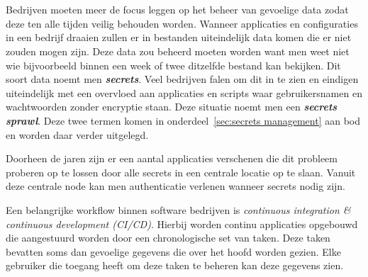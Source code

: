 
\chapter{}
\label{ch:inleiding}

Bedrijven moeten meer de focus leggen op het beheer van gevoelige data zodat deze ten alle tijden veilig behouden worden. Wanneer applicaties en configuraties in een bedrijf draaien zullen er in bestanden uiteindelijk data komen die er niet zouden mogen zijn. Deze data zou beheerd moeten worden want men weet niet wie bijvoorbeeld binnen een week of twee ditzelfde bestand kan bekijken. Dit soort data noemt men \textit{\textbf{secrets}}. Veel bedrijven falen om dit in te zien en eindigen uiteindelijk met een overvloed aan applicaties en scripts waar gebruikersnamen en wachtwoorden zonder encryptie staan. Deze situatie noemt men een \textit{\textbf{secrets sprawl}}. Deze twee termen komen in onderdeel~\ref{sec:secrets management} aan bod en worden daar verder uitgelegd.

Doorheen de jaren zijn er een aantal applicaties verschenen die dit probleem proberen op te lossen door alle secrets in een centrale locatie op te slaan. Vanuit deze centrale node kan men authenticatie verlenen wanneer secrets nodig zijn. 

Een belangrijke workflow binnen software bedrijven is \textit{continuous integration \& continuous development (CI/CD)}. Hierbij worden continu applicaties opgebouwd die aangestuurd worden door een chronologische set van taken. Deze taken bevatten soms dan gevoelige gegevens die over het hoofd worden gezien. Elke gebruiker die toegang heeft om deze taken te beheren kan deze gegevens zien.


\section{}
\label{sec:probleemstelling}

